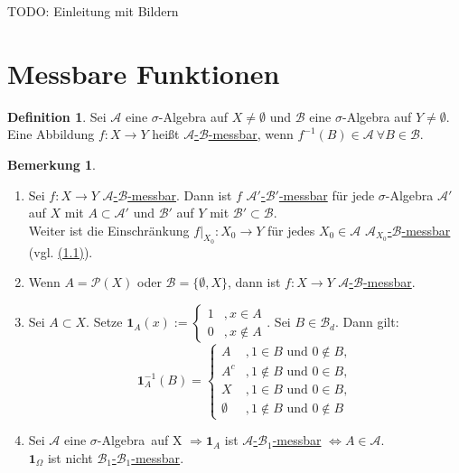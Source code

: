 \documentclass[a4paper]{report}
\newcommand{\PowerSet}{\mathcal{P}}
\newcommand{\doubleOne}{\textbf{1}}
\newcommand{\Borel}{\mathcal{B}}
\newcommand{\Bd}{\Borel_d}
\newcommand{\jlabel}[1]{\label{j_#1}}
\newcommand{\jhyperref}[2]{\hyperref[j_#1]{#2}}
\newcommand{\jlink}[1]{\jhyperref{#1}{#1}}
\newcommand{\mb}[2]{\jhyperref{messbar}{#1-#2-messbar}}
\newcommand{\calMb}[2]{\mb{$\mathcal{#1}$}{$\mathcal{#2}$}}
\newcommand{\jabb}[3]{ #1: #2 \rightarrow #3 }
\newcommand{\jsigalg}{$\sigma$-Algebra}
\theoremstyle{plain}
\theoremstyle{definition}
\newtheorem{defn}[thm]{Definition}
\newtheorem{bem}[thm]{Bemerkung}
\begin{document}
{{{    TODO: Einleitung mit Bildern

\section{Messbare Funktionen}

\begin{defn}
\jlabel{Def 2.1}
\jlabel{messbar}
    Sei $\mathcal{A}$ eine $\sigma$-Algebra auf $X\ne\emptyset$ und $\Borel$ eine $\sigma$-Algebra auf $Y\ne \emptyset$. Eine Abbildung $f:X \rightarrow Y$ heißt \uline{\calMb{A}{B}}, wenn $f^{-1}(B) \in \mathcal{A}\ \forall B\in \Borel$.
\end{defn}

\jlabel{Bem 2.2}
\begin{bem}
    \begin{enumerate}
        \item
            Sei $f: X \rightarrow Y$ \calMb{A}{B}. Dann ist $f$ \calMb{A'}{B'} für jede $\sigma$-Algebra $\mathcal{A}'$ auf $X$ mit $A\subset \mathcal{A'}$ und $\mathcal{B'}$ auf $Y$ mit $\mathcal{B'} \subset \Borel$.\\
            Weiter ist die Einschränkung $\jabb{f|_{X_0}}{X_0}{Y}$ für jedes $X_0 \in \mathcal{A}$ \mb{$\mathcal{A}_{X_0}$}{$\Borel$} (vgl. \jlink{(1.1)}).
            
        \item Wenn $A = \PowerSet(X)$ oder $\Borel = \{\emptyset, X\}$, dann ist $\jabb{f}{X}{Y}$ \calMb{A}{B}.
        \item Sei $A\subset X$. Setze $\doubleOne_A(x) := \begin{cases} 1 &, x\in A \\ 0 &, x \notin A \end{cases}$. Sei $B \in \Bd$. Dann gilt:
        \begin{displaymath}
            \doubleOne_A^{-1}(B) = 
            \begin{cases}
                A &, 1 \in B \text{ und } 0 \notin B, \\
                A^c &, 1 \notin B \text{ und } 0 \in B, \\
                X &, 1 \in B \text{ und } 0 \in B, \\
                \emptyset &, 1 \notin B \text{ und } 0 \notin B
            \end{cases}
        \end{displaymath}
        \item Sei $\mathcal{A}$ eine \jsigalg \ auf X $\Rightarrow \doubleOne_A$ ist \mb{$\mathcal{A}$}{$\Borel_1$} $\Leftrightarrow A \in \mathcal{A}$.\\
        $\doubleOne_{\Omega}$ ist nicht \mb{$\Borel_1$}{$\Borel_1$}.
        

\end{enumerate}
\end{bem}}}}
\end{document}
